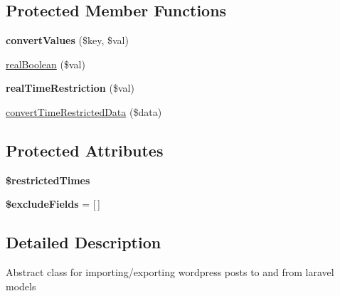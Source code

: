 \subsection*{Protected Member Functions}
\begin{DoxyCompactItemize}
\item 
\hypertarget{classDMA_1_1Friends_1_1Wordpress_1_1Post_a8969b8476b3ba0afc871532f6f936514}{{\bfseries convert\-Values} (\$key, \$val)}\label{classDMA_1_1Friends_1_1Wordpress_1_1Post_a8969b8476b3ba0afc871532f6f936514}

\item 
\hyperlink{classDMA_1_1Friends_1_1Wordpress_1_1Post_a37fb0931dadba67a39a637b336787663}{real\-Boolean} (\$val)
\item 
\hypertarget{classDMA_1_1Friends_1_1Wordpress_1_1Post_a5fbf4b003c2136d8497ddd7d726ad671}{{\bfseries real\-Time\-Restriction} (\$val)}\label{classDMA_1_1Friends_1_1Wordpress_1_1Post_a5fbf4b003c2136d8497ddd7d726ad671}

\item 
\hyperlink{classDMA_1_1Friends_1_1Wordpress_1_1Post_a427b14dd99893217929ee8ee93977628}{convert\-Time\-Restricted\-Data} (\$data)
\end{DoxyCompactItemize}
\subsection*{Protected Attributes}
\begin{DoxyCompactItemize}
\item 
{\bfseries \$restricted\-Times}
\item 
\hypertarget{classDMA_1_1Friends_1_1Wordpress_1_1Post_ac9f76efeb858c94d5ab78e74b4301c16}{{\bfseries \$exclude\-Fields} = \mbox{[}$\,$\mbox{]}}\label{classDMA_1_1Friends_1_1Wordpress_1_1Post_ac9f76efeb858c94d5ab78e74b4301c16}

\end{DoxyCompactItemize}


\subsection{Detailed Description}
Abstract class for importing/exporting wordpress posts to and from laravel models 

